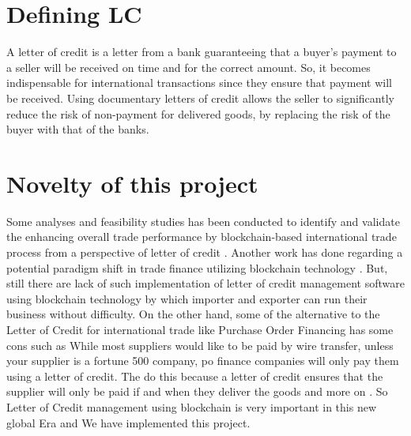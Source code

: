 \documentclass[a4paper,12pt]{report}
\begin{document}
\vspace{15pt}
\section{Defining LC}
A letter of credit is a letter from a bank guaranteeing that a buyer's payment to a seller will be received on time and for the correct amount. So, it becomes indispensable for international transactions since they ensure that payment will be received. Using documentary letters of credit allows the seller to significantly reduce the risk of non-payment for delivered goods, by replacing the risk of the buyer with that of the banks.

\vspace{15pt}
\section{Novelty of this project}
Some analyses and feasibility studies has been conducted to identify and validate the enhancing overall trade performance by blockchain-based international trade process from a perspective of letter of credit \cite{justexploring2019}. Another work has done regarding a potential paradigm shift in trade finance utilizing blockchain technology \cite{chang2020blockchain}. But, still there are lack of such implementation of letter of credit management software using blockchain technology by which importer and exporter can run their business without difficulty. On the other hand, some of the alternative to the Letter of Credit for international trade like Purchase Order Financing has some cons such as While most suppliers would like to be paid by wire transfer, unless your supplier is a fortune 500 company, po finance companies will only pay them using a letter of credit. The do this because a letter of credit ensures that the supplier will only be paid if and when they deliver the goods and more on \cite{purchaseorder2021effects}. So Letter of Credit management using blockchain is very important in this new global Era and We have implemented this project.

\vspace{15pt}
\end{document}
